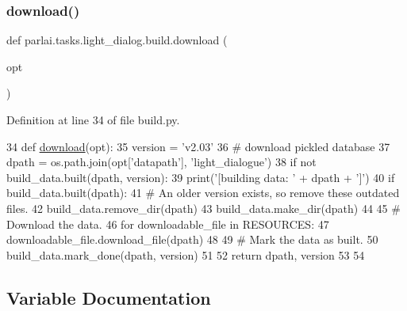 \subsubsection{\texorpdfstring{download()}{download()}}
{\footnotesize\ttfamily def parlai.\+tasks.\+light\+\_\+dialog.\+build.\+download (\begin{DoxyParamCaption}\item[{}]{opt }\end{DoxyParamCaption})}



Definition at line 34 of file build.\+py.


\begin{DoxyCode}
34 \textcolor{keyword}{def }\hyperlink{namespaceparlai_1_1zoo_1_1pretrained__transformers_1_1build_afaead0deab400e1c516706e85dd4ed9b}{download}(opt):
35     version = \textcolor{stringliteral}{'v2.03'}
36     \textcolor{comment}{# download pickled database}
37     dpath = os.path.join(opt[\textcolor{stringliteral}{'datapath'}], \textcolor{stringliteral}{'light\_dialogue'})
38     \textcolor{keywordflow}{if} \textcolor{keywordflow}{not} build\_data.built(dpath, version):
39         print(\textcolor{stringliteral}{'[building data: '} + dpath + \textcolor{stringliteral}{']'})
40         \textcolor{keywordflow}{if} build\_data.built(dpath):
41             \textcolor{comment}{# An older version exists, so remove these outdated files.}
42             build\_data.remove\_dir(dpath)
43         build\_data.make\_dir(dpath)
44 
45         \textcolor{comment}{# Download the data.}
46         \textcolor{keywordflow}{for} downloadable\_file \textcolor{keywordflow}{in} RESOURCES:
47             downloadable\_file.download\_file(dpath)
48 
49         \textcolor{comment}{# Mark the data as built.}
50         build\_data.mark\_done(dpath, version)
51 
52     \textcolor{keywordflow}{return} dpath, version
53 
54 
\end{DoxyCode}


\subsection{Variable Documentation}
\mbox{\label{namespaceparlai_1_1tasks_1_1light__dialog_1_1build_ab85c5847d6a7dabb0d18a66790034ced}} 
